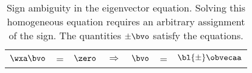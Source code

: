 \begin{table}[htdp]
\caption[Sign ambiguity in the eigenvector equation]{Sign ambiguity in the eigenvector equation. Solving this homogeneous equation requires an arbitrary assignment of the sign. The quantities $\pm \bvo$ satisfy the equations.}
\begin{center}
\begin{tabular}{ccccccc}
%
$\wxa \bvo$ &=& $\zero$ & \qquad $\Longrightarrow$ \qquad \quad & $\bvo$ &=& ${\bl{ \pm }} \obvecaa$
%
\end{tabular}
\end{center}
\label{tab:uniqueness:sign}
\end{table}%

\endinput